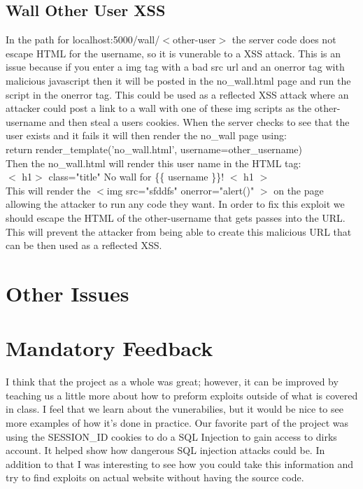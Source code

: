 \documentclass[12pt]{article}
\begin{document}
\subsection{Wall Other User XSS}
In the path for localhost:5000/wall/$<$other-user$>$ the server code does not escape HTML for the username, so it is vunerable to a XSS attack. This is an issue because if you enter a img tag with a bad src url and an onerror tag with malicious javascript then it will be posted in the no\_wall.html page and run the script in the onerror tag. This could be used as a reflected XSS attack where an attacker could post a link to a wall with one of these img scripts as the other-username and then steal a users cookies. When the server checks to see that the user exists and it fails it will then render the no\_wall page using: \\
	return render\_template('no\_wall.html', username=other\_username) \\
Then the no\_wall.html will render this user name in the HTML tag:\\
$<$ h1$>$ class="title"  No wall for \{\{ username \}\}! $<$ \/h1 $>$\\
This will render the $<$img src="sfddfs" onerror="alert()" $>$ on the page allowing the attacker to run any code they want. In order to fix this exploit we should escape the HTML of the other-username that gets passes into the URL. This will prevent the attacker from being able to create this malicious URL that can be then used as a reflected XSS.
\section{Other Issues}

\section{Mandatory Feedback}
I think that the project as a whole was great; however, it can be improved by teaching us a little more about how to preform exploits outside of what is covered in class. I feel that we learn about the vunerabilies, but it would be nice to see more examples of how it's done in practice. Our favorite part of the project was using the SESSION\_ID cookies to do a SQL Injection to gain access to dirks account. It helped show how dangerous SQL injection attacks could be. In addition to that I was interesting to see how you could take this information and try to find exploits on actual website without having the source code.
\end{document}
